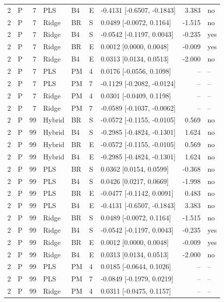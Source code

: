 \documentclass[10pt,a4paper]{article}
\begin{document}
\begin{landscape}
\begin{longtable}{rlrllllrl}
2 & P & 7 & PLS & B4 & E & -0.4131 [-0.6507, -0.1843] & 3.383 & no \\
2 & P & 7 & Ridge & BR & S & 0.0489 [-0.0072, 0.1164] & -1.515 & no \\
2 & P & 7 & Ridge & B4 & S & -0.0542 [-0.1197, 0.0043] & -0.235 & yes \\
2 & P & 7 & Ridge & BR & E & 0.0012 [0.0000, 0.0048] & -0.009 & yes \\
2 & P & 7 & Ridge & B4 & E & 0.0313 [0.0134, 0.0513] & -2.000 & no \\
2 & P & 7 & PLS & PM & 4 & 0.0176 [-0.0556, 0.1098] & -- & -- \\
2 & P & 7 & PLS & PM & 7 & -0.1129 [-0.2082, -0.0124] & -- & -- \\
2 & P & 7 & Ridge & PM & 4 & 0.0301 [-0.0409, 0.1198] & -- & -- \\
2 & P & 7 & Ridge & PM & 7 & -0.0589 [-0.1037, -0.0062] & -- & -- \\
2 & P & 99 & Hybrid & BR & S & -0.0572 [-0.1155, -0.0105] & 0.569 & no \\
2 & P & 99 & Hybrid & B4 & S & -0.2985 [-0.4824, -0.1301] & 1.624 & no \\
2 & P & 99 & Hybrid & BR & E & -0.0572 [-0.1155, -0.0105] & 0.569 & no \\
2 & P & 99 & Hybrid & B4 & E & -0.2985 [-0.4824, -0.1301] & 1.624 & no \\
2 & P & 99 & PLS & BR & S & 0.0362 [0.0154, 0.0599] & -0.368 & no \\
2 & P & 99 & PLS & B4 & S & 0.0426 [0.0217, 0.0669] & -1.998 & no \\
2 & P & 99 & PLS & BR & E & -0.0477 [-0.1142, 0.0091] & 0.483 & no \\
2 & P & 99 & PLS & B4 & E & -0.4131 [-0.6507, -0.1843] & 3.383 & no \\
2 & P & 99 & Ridge & BR & S & 0.0489 [-0.0072, 0.1164] & -1.515 & no \\
2 & P & 99 & Ridge & B4 & S & -0.0542 [-0.1197, 0.0043] & -0.235 & yes \\
2 & P & 99 & Ridge & BR & E & 0.0012 [0.0000, 0.0048] & -0.009 & yes \\
2 & P & 99 & Ridge & B4 & E & 0.0313 [0.0134, 0.0513] & -2.000 & no \\
2 & P & 99 & PLS & PM & 4 & 0.0185 [-0.0644, 0.1026] & -- & -- \\
2 & P & 99 & PLS & PM & 7 & -0.0849 [-0.1979, 0.0219] & -- & -- \\
2 & P & 99 & Ridge & PM & 4 & 0.0311 [-0.0475, 0.1157] & -- & -- \\

\end{longtable}
\end{landscape}
\end{document}
